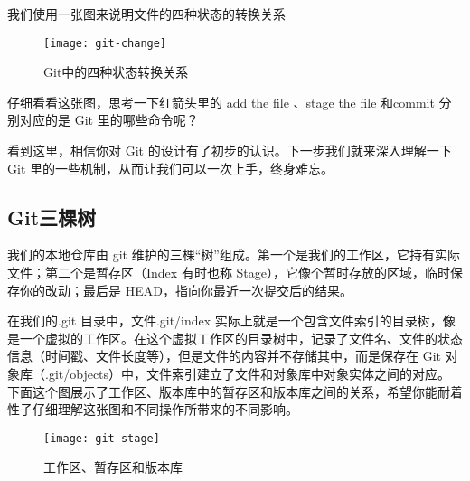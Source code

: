 我们使用一张图来说明文件的四种状态的转换关系

\begin{figure}[htbp]
	\centering
	\texttt{[image: git-change]}
	\caption{Git中的四种状态转换关系}\label{fig:git-change}
\end{figure}

\begin{thinking}\label{think-箭头与指令}
仔细看看这张图，思考一下红箭头里的 add the file 、stage the file 和commit 分别对应的是 Git 里的哪些命令呢？
\end{thinking}

看到这里，相信你对 Git 的设计有了初步的认识。下一步我们就来深入理解一下 Git 里的一些机制，从而让我们可以一次上手，终身难忘。

\subsection{Git三棵树}
我们的本地仓库由 git 维护的三棵“树”组成。第一个是我们的工作区，它持有实际文件；第二个是暂存区（Index 有时也称 Stage），它像个暂时存放的区域，临时保存你的改动；最后是 HEAD，指向你最近一次提交后的结果。 

在我们的.git 目录中，文件.git/index 实际上就是一个包含文件索引的目录树，像是一个虚拟的工作区。在这个虚拟工作区的目录树中，记录了文件名、文件的状态信息（时间戳、文件长度等），但是文件的内容并不存储其中，而是保存在 Git 对象库（.git/objects）中，文件索引建立了文件和对象库中对象实体之间的对应。下面这个图展示了工作区、版本库中的暂存区和版本库之间的关系，希望你能耐着性子仔细理解这张图和不同操作所带来的不同影响。

\begin{figure}[htbp]
  \centering
  \texttt{[image: git-stage]}
  \caption{工作区、暂存区和版本库}\label{fig:git-stage} 
\end{figure}

